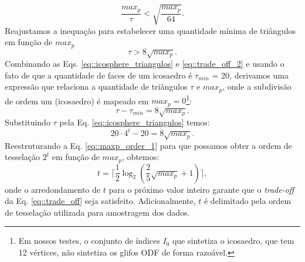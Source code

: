 \begin{equation}
\label{eq::trade_off}
    \frac{max_p}{\tau} < \sqrt{\frac{max_p}{64}}.
\end{equation}
Reajustamos a inequação para estabelecer uma quantidade mínima de triângulos em função de $max_p$
\begin{equation}
\label{eq::trade_off_2}
    \tau > 8\sqrt{max_p}
    .
\end{equation}
Combinando as Eqs. \ref{eq::icosphere_triangulos} e \ref{eq::trade_off_2} e usando o fato de que a quantidade de faces de um icosaedro é $\tau_{min}$ = 20, derivamos uma expressão que relaciona a quantidade de triângulos $\tau$ e $max_p$, onde a subdivisão de ordem um (icosaedro) é mapeado em $max_p = 0$\footnote{Em nossos testes, o conjunto de índices $I_0$ que sintetiza o icosaedro, que tem 12 vértices, não sintetiza os glifos ODF de forma razoável.}:
\begin{equation}
\label{eq::maxp_triangulo}
    \tau - \tau_{min} = 8\sqrt{max_p}.
\end{equation}
Substituindo $\tau$ pela Eq. \ref{eq::icosphere_triangulos} temos:
\begin{equation}
\label{eq::maxp_order_1}
    20 \cdot 4^t - 20 = 8\sqrt{max_p}    .
\end{equation}
Reestruturando a Eq. \ref{eq::maxp_order_1} para que possamos obter a ordem de tesselação $2^t$ em função de $max_p$, obtemos:
\begin{equation}
\label{eq::icosa_order}
     t = \lceil \frac{1}{2}\log_2{(\frac{2}{5}\sqrt{max_p} + 1)} \rceil,
\end{equation}
onde o arredondamento de $t$ para o próximo valor inteiro garante que o \textit{trade-off} da Eq. \ref{eq::trade_off} seja satisfeito. Adicionalmente, $t$ é delimitado pela ordem de tesselação utilizada para amostragem dos dados.

